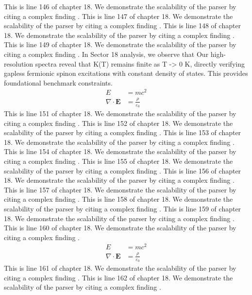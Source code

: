 This is line 146 of chapter 18. We demonstrate the scalability of the parser by citing a complex finding \cite{ref18_146}.
This is line 147 of chapter 18. We demonstrate the scalability of the parser by citing a complex finding \cite{ref18_147}.
This is line 148 of chapter 18. We demonstrate the scalability of the parser by citing a complex finding \cite{ref18_148}.
This is line 149 of chapter 18. We demonstrate the scalability of the parser by citing a complex finding \cite{ref18_149}.
In Sector 18 analysis, we observe that Our high-resolution spectra reveal that K(T) remains finite as T -> 0 K, directly verifying gapless fermionic spinon excitations with constant density of states. This provides foundational benchmark constraints.
\begin{align*}
  E &= mc^2 \\
  \nabla \cdot \mathbf{E} &= \frac{\rho}{\varepsilon_0}
\end{align*}
This is line 151 of chapter 18. We demonstrate the scalability of the parser by citing a complex finding \cite{ref18_151}.
This is line 152 of chapter 18. We demonstrate the scalability of the parser by citing a complex finding \cite{ref18_152}.
This is line 153 of chapter 18. We demonstrate the scalability of the parser by citing a complex finding \cite{ref18_153}.
This is line 154 of chapter 18. We demonstrate the scalability of the parser by citing a complex finding \cite{ref18_154}.
This is line 155 of chapter 18. We demonstrate the scalability of the parser by citing a complex finding \cite{ref18_155}.
This is line 156 of chapter 18. We demonstrate the scalability of the parser by citing a complex finding \cite{ref18_156}.
This is line 157 of chapter 18. We demonstrate the scalability of the parser by citing a complex finding \cite{ref18_157}.
This is line 158 of chapter 18. We demonstrate the scalability of the parser by citing a complex finding \cite{ref18_158}.
This is line 159 of chapter 18. We demonstrate the scalability of the parser by citing a complex finding \cite{ref18_159}.
This is line 160 of chapter 18. We demonstrate the scalability of the parser by citing a complex finding \cite{ref18_160}.
\begin{align*}
  E &= mc^2 \\
  \nabla \cdot \mathbf{E} &= \frac{\rho}{\varepsilon_0}
\end{align*}
This is line 161 of chapter 18. We demonstrate the scalability of the parser by citing a complex finding \cite{ref18_161}.
This is line 162 of chapter 18. We demonstrate the scalability of the parser by citing a complex finding \cite{ref18_162}.
